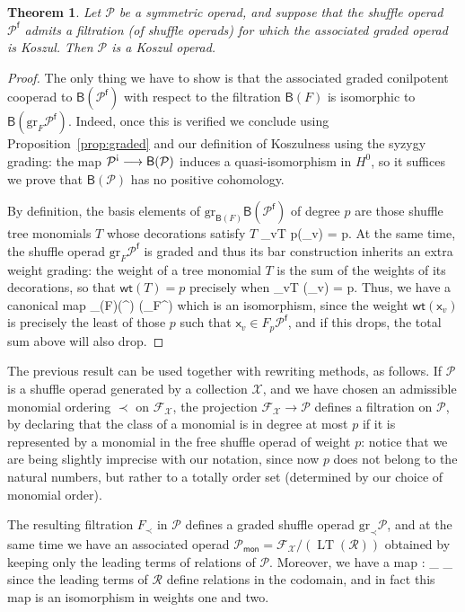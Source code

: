 \documentclass[fleqn, a4paper, twoside]{article}
\makeatletter
\newcommand{\lead}[1]{\operatorname{LT}(#1)}
\newcommand{\antishriek}{\text{\raisebox{\depth}{\textexclamdown}}}
\newcommand{\0}{\langle 0\rangle}
\newcommand{\XX}{\mathcal{X}}
\newcommand{\RR}{\mathcal{R}}
\newcommand{\FF}{\mathcal{F}}
\newcommand{\B}[1]{\mathsf{B}(#1)}
\newcommand{\f}{\mathsf{f}}
\let\[\@undefined
\DeclareRobustCommand{\[}{\begin{equation}}%
\let\]\@undefined
\DeclareRobustCommand{\]}{\end{equation}}%
\theoremstyle{mytheorem}
\newtheorem{theorem}{Theorem}[section]
\theoremstyle{introthm}
\theoremstyle{mydefinition}
\theoremstyle{mydefinition2}
\theoremstyle{plain} %
\newcommand{\?}{\,?\,}
\newcommand{\PP}{{\mathcal{P}}}
\theoremstyle{mytheorem}
\theoremstyle{plain} %
\makeatother
\begin{document}
 \begin{theorem}
 Let $\PP$ be a symmetric operad, and suppose
 that the shuffle operad $\PP^\f$ admits
 a filtration (of shuffle operads) for which
 the associated graded operad is Koszul.
 Then $\PP$ is a Koszul operad.
 \end{theorem}
 
 \begin{proof}
 The only thing we have to show is that the
 associated graded conilpotent cooperad to
 $\B{\PP^\f}$ with respect to the filtration
 $\B{F}$ is isomorphic to $\B{\mathrm{gr}_F\PP^\f}$.
 Indeed, once this is verified we conclude using
 Proposition~\ref{prop:graded} and our definition
 of Koszulness using the syzygy grading: the
 map $\PP^\antishriek \longrightarrow \B{\PP}$
 induces a quasi-isomorphism in $H^0$, so it suffices
 we prove that $\B{\PP}$ has no positive cohomology.
 
 By definition, the basis elements of
 $\mathrm{gr}_{\B{F}}\B{\PP^\f}$ of degree $p$
 are those shuffle tree monomials $T$
 whose decorations satisfy $T$
 \[
 \sum_{v\in T} p(_v) = p.
 \]
 At the same time, the shuffle operad 
 $\mathrm{gr}_F\PP^\f$  is graded and 
 thus its bar construction inherits an
 extra weight grading: the weight of a tree
 monomial $T$ is the sum of the weights of its
 decorations, so that $\mathsf{wt}(T)= p$
 precisely when
 \[
 \sum_{v\in T} (_v) = p.
 \]
 Thus, we have a canonical map
 \[
 _{\B{F}}\B{\PP^\f} \longrightarrow
 \B{_F\PP^\f}
 \]
 which is an isomorphism, since the weight
 $\mathsf{wt}(\mathsf{x}_v)$ is precisely
 the least of those $p$ such that $\mathsf{x}_v
 \in F_p\PP^\f$, and if this drops, the total sum above
 will also drop. 
 \end{proof}
 
 The previous result can be used together with
 rewriting methods, as follows. If $\PP$ is
 a shuffle operad generated by a collection
 $\XX$, and we have chosen an admissible 
 monomial ordering $\prec $
 on $\FF_\XX$, the projection
 $\FF_\XX\longrightarrow \PP$ defines a filtration
 on $\PP$, by declaring that the class of a 
 monomial is in degree at most $p$ if it
 is represented by a monomial in the free shuffle
 operad of weight $p$: notice that we are being
 slightly imprecise with our notation, since now
 $p$ does not belong to the natural numbers,
 but rather to a totally order set (determined by
 our choice of monomial order).
 
 The resulting filtration $F_\prec$ in $\PP$
 defines a graded shuffle operad $\mathrm{gr}_\prec
 \PP$, and at the same time we have an associated
 operad $\PP_{\mathsf{mon}} = \FF_\XX / (\lead{\RR})$
 obtained by keeping only the leading terms
 of relations of $\PP$. Moreover, we have a map
 \[
 \pi : \PP_{} 
  	\longrightarrow 
  	_\prec \PP
 \]
 since the leading terms of $\RR$ define
 relations in the codomain, and in fact this
 map is an isomorphism in weights one and two.
 
\end{document}
